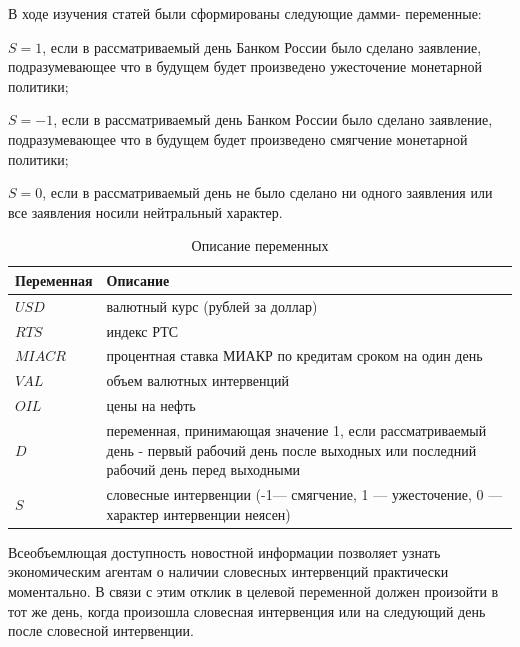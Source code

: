 \documentclass[14pt,a4paper, oneside]{extreport}
\newcounter{notes}
\renewenvironment{enumerate}%
{\begin{list}{\arabic{notes})} {\usecounter{notes}%
\setlength{\parsep}{0em}%
\setlength{\itemsep}{0em}%
\setlength{\topsep}{0.75ex}%
\setlength{\parskip}{0em}
}}%
{\end{list}}
\theoremstyle{plain}              %
\theoremstyle{definition}         %
\begin{document}
В ходе изучения статей были сформированы следующие дамми-
переменные:

\begin{enumerate}
\item[] $S=1$, если в рассматриваемый день Банком России было сделано заявление, подразумевающее что в будущем будет произведено ужесточение монетарной политики;

\item[] $S=-1$, если в рассматриваемый день Банком России было сделано заявление, подразумевающее что в будущем будет произведено смягчение монетарной политики;

\item[] $S=0$, если в рассматриваемый день не было сделано ни одного заявления или все заявления носили нейтральный характер.
\end{enumerate}

\begin{table}[h]
	\begin{center}
		\caption{Описание переменных}\label{varieble}
		\begin{tabular}{|m{3cm}|m{8cm}|}
  		\hline
  		Переменная & Описание \\ \hline
    	$USD$ & валютный курс (рублей за доллар)  \\ \hline
  		$RTS$ & индекс РТС \\ \hline
  		$MIACR$ & процентная ставка МИАКР по кредитам сроком на один день \\ \hline
  		$VAL$ & объем валютных интервенций\\ \hline
  		$OIL$ & цены на нефть \\ \hline
  		$D$ & переменная, принимающая значение 1, если рассматриваемый день - первый рабочий день после выходных или последний рабочий день перед выходными \\ \hline
  		$S$ & словесные интервенции (-1--- смягчение, 1 --- ужесточение, 0 --- характер интервенции неясен) \\ \hline
		\end{tabular}
	\end{center}
\end{table}

Всеобъемлющая доступность новостной информации позволяет узнать экономическим агентам о наличии словесных интервенций практически моментально. В связи с этим отклик в целевой переменной должен произойти в тот же день, когда произошла словесная интервенция или на следующий день после словесной интервенции.
\end{document}
